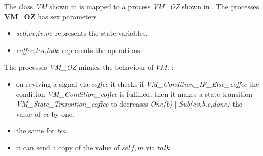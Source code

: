 The class \textit{VM} shown in  is mapped to a \picalc{} process \textit{VM\_OZ} shown in . The processes \textbf{VM\_OZ} has sex parameters
\begin{itemize}
\item \textit{self,cv,tv,m}: represents the state variables.
\item \textit{coffee,tea,talk}: represents the operations.
\end{itemize}
The processes \textit{VM\_OZ} mimics the behaviour of $VM$. :
\begin{itemize}
\item on reviving a signal via \textit{coffee} it checks if \textit{VM\_Condition\_IF\_Else\_coffee} the condition \textit{VM\_Condition\_coffee} is fulfilled, then it makes a state transition \textit{VM\_State\_Transition\_coffee} to  decreases \textit{One(b) }| \textit{Sub(cv,b,c,done)} the value of \textit{cv} by one.
\item the same for \textit{tea}.
\item it can send a copy of the value of $self,m$ via $talk$
\end{itemize}

